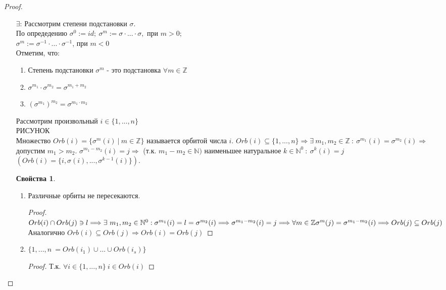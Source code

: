 \documentclass[a4paper, 12pt]{article}
\newcommand{\Z}{\mathbb Z}
\newcommand{\N}{\mathbb N}
\newcommand\tab[1][.5cm]{\hspace*{#1}}
\theoremstyle{definition}
\newtheorem*{properties}{Свойства}
\begin{document}
\begin{proof} \tab
  \begin{itemize}
    \item[ $\exists$: ] Рассмотрим степени подстановки $\sigma$. \\
    По опредедению $\sigma^0 := id; \ \sigma^m := \sigma \cdot ... \cdot \sigma, $ при $m>0; $\\ \tab[5.75cm] $\sigma^m := \sigma^{-1} \cdot ...\cdot \sigma^{-1}$, при $m<0$ \\
    Отметим, что: \begin{enumerate}
      \item Степень подстановки $\sigma^m$ - это подстановка $\forall m \in \Z$ 
      \item $\sigma^{m_1}\cdot \sigma^{m_2} = \sigma^{m_1+m_2}$
      \item $(\sigma^{m_1})^{m_2} = \sigma^{m_1 \cdot m_2}$  
    \end{enumerate}
    Рассмотрим произвольный $i \in \{1,...,n\}$ \\
    РИСУНОК\\
    Множество $Orb(i) = \{\sigma^m(i) \ | \ m \in \Z\}$  называется орбитой числа $i$. $Orb(i) \subseteq \{1,...,n\} \Longrightarrow \exists \ m_1,m_2 \in \Z \ : \ \sigma^{m_1}(i) = \sigma^{m_2}(i) \Longrightarrow $ допустим $m_1 > m_2$. $\sigma^{m_1 - m_2}(i)=j \Longrightarrow $ (т.к. $m_1 - m_2 \in \N)$  наименьшее натуральное $k \in \N^0 \ : \ \sigma^k(i)= j$ 
    $(Orb(i) = \{i, \sigma(i),...,\sigma^{k-1}(i)\})$.
    \begin{properties} \tab
      \begin{enumerate}
        \item Различные орбиты не пересекаются. 
        \begin{proof}
          $Orb(i) \cap Orb(j) \ni l \Longrightarrow \exists \ m_1, m_2 \in \N^0 : \\
        \sigma^{m_1}(i) = l = \sigma^{m_2}(i) \Longrightarrow \sigma^{m_1-m_2}(i) = j \Longrightarrow \forall m \in \Z \\
        \sigma^{m}(j)= \sigma^{m_1-m_2}(i) \Longrightarrow Orb(j) \subseteq  Orb(j)$ \\
        Аналогично $Orb(i) \subseteq Orb(j) \Longrightarrow Orb(i) = Orb(j)$
        \end{proof} 
        \item $\{1,...,n\ = Orb(i_1) \cup ... \cup Orb(i_s)\}$ 
        \begin{proof}
          Т.к. $\forall i \in \{1,...,n\} \ i \in Orb(i)$ 

\end{proof}
\end{enumerate}
\end{properties}
\end{itemize}
\end{proof}
\end{document}
